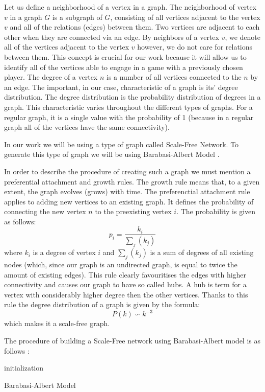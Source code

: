\documentclass[english, twoside, 12pt, a4paper]{article}
\theoremstyle{definition}
\theoremstyle{plain}
\theoremstyle{remark}
\begin{document}
Let us define a neighborhood of a vertex in a graph. The neighborhood of vertex $v$ in a graph $G$ is a subgraph of $G$, consisting of all vertices adjacent to the vertex $v$ and all of the relations (edges) between them. Two vertices are adjacent to each other when they are connected via an edge. By neighbors of a vertex $v$, we denote all of the vertices adjacent to the vertex $v$ however, we do not care for relations between them. This concept is crucial for our work because it will allow us to identify all of the vertices able to engage in a game with a previously chosen player. The degree of a vertex $n$ is a number of all vertices connected to the $n$ by an edge.
The important, in our case, characteristic of a graph is its' degree distribution. The degree distribution is the probability distribution of degrees in a graph. This characteristic varies throughout the different types of graphs. For a regular graph, it is a single value with the probability of 1 (because in a regular graph all of the vertices have the same connectivity). 

In our work we will be using a type of graph called Scale-Free Network. To generate this type of graph we will be using Barabasi-Albert Model \cite{albert2002statistical}. 

In order to describe the procedure of creating such a graph we must mention a preferential attachment and growth rules. The growth rule means that, to a given extent, the graph evolves (grows) with time. The preferenctial attachment rule applies to adding new vertices to an existing graph. It defines the probability of connecting the new vertex $n$ to the preexisting vertex $i$. The probability is given as follows:
\[ p_i = \frac{k_i}{\sum_j(k_j)}  \]
where $k_i$ is a degree of vertex $i$ and $\sum_j(k_j)$ is a sum of degrees of all existing nodes (which, since our graph is an undirected graph, is equal to twice the amount of existing edges). This rule clearly favouritises the edges with higher connectivity and causes our graph to have so called hubs. A hub is term for a vertex with considerably higher degree then the other vertices. Thanks to this rule the degree distribution of a graph is given by the formula:
\[ P(k) \backsim k^{-3}\]
which makes it a scale-free graph. 


The procedure of building a Scale-Free network using Barabasi-Albert model is as follows \cite{albert2002statistical}:

\begin{algorithm}[H]
 initialization\;
 \caption{Barabasi-Albert Model}
\end{algorithm}
\end{document}
